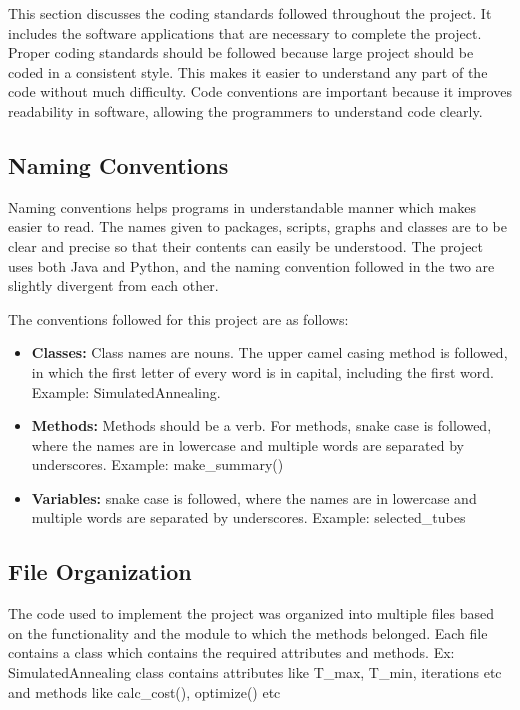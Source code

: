 This section discusses the coding standards followed throughout the project. It includes the software applications that are necessary to complete the project. Proper coding standards should be followed because large project should be coded in a consistent style. This makes it easier to understand any part of the code without much difficulty. Code conventions are important because it improves readability in software, allowing the programmers to understand code clearly.

    \subsection{Naming Conventions}

    Naming conventions helps programs in understandable manner which makes easier to read. The names given to packages, scripts, graphs and classes are to be clear and precise so that their contents can easily be understood. The project uses both Java and Python, and the naming convention followed in the two are slightly divergent from each other.

    The conventions followed for this project are as follows:

    \begin{itemize}
        \item \textbf{Classes:} Class names are nouns. The upper camel casing method is followed, in which the first letter of every word is in capital, including the first word. Example: SimulatedAnnealing.
        \item \textbf{Methods:} Methods should be a verb. For methods, snake case is followed, where the names are in lowercase and multiple words are separated by underscores. Example: make\_summary()
        \item \textbf{Variables:} snake case is followed, where the names are in lowercase and multiple words are separated by underscores. Example: selected\_tubes
    \end{itemize}

    \subsection{File Organization}
    The code used to implement the project was organized into multiple files based on the functionality and the module to which the methods belonged. Each file contains a class which contains the required attributes and methods.
    Ex: SimulatedAnnealing class contains attributes like T\_max, T\_min, iterations etc and methods like calc\_cost(), optimize() etc


